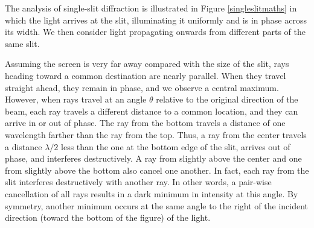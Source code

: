 \documentclass[a4paper,12pt]{book}
\begin{document}
The analysis of single-slit diffraction is illustrated in Figure \ref{singleslitmaths} in which the light arrives at the slit, illuminating it uniformly and is in phase across its width. We then consider light propagating onwards from different parts of the same slit. 

Assuming the screen is very far away compared with the size of the slit, rays heading toward a common destination are nearly parallel. When they travel straight ahead, they remain in phase, and we observe a central maximum. However, when rays travel at an angle $\theta$ relative to the original direction of the beam, each ray travels a different distance to a common location, and they can arrive in or out of phase. The ray from the bottom travels a distance of one wavelength farther than the ray from the top. Thus, a ray from the center travels a distance $\lambda/2$ less than the one at the bottom edge of the slit, arrives out of phase, and interferes destructively. A ray from slightly above the center and one from slightly above the bottom also cancel one another. In fact, each ray from the slit interferes destructively with another ray. In other words, a pair-wise cancellation of all rays results in a dark minimum in intensity at this angle. By symmetry, another minimum occurs at the same angle to the right of the incident direction (toward the bottom of the figure) of the light.

  
  
  
  
\end{document}
